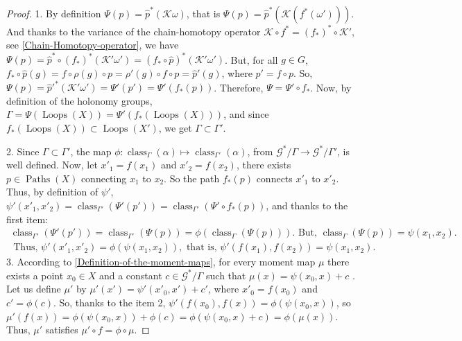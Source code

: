 \documentclass[10pt,reqno,twoside]{amsart}
\newcommand{\cG}{\mathcal{G}}
\newcommand{\cK}{\mathcal{K}}
\DeclareMathOperator{\Paths}{Paths}
\DeclareMathOperator{\Loops}{Loops}
\DeclareMathOperator{\class}{class}
\theoremstyle{plain}
\theoremstyle{definition}
\begin{document}
  \begin{proof}
    1. By definition $\Psi(p) = \hat p^*(\cK\omega)$,
    that is $ \Psi(p) = \hat p^*(\cK(f^*(\omega')))$.
    And thanks to the variance of the chain-homotopy operator $\cK \circ f^* = (f_*)^* \circ \cK'$,
    see \ref{Chain-Homotopy-operator},
    we have $\Psi(p) = \hat p^* \circ (f_*)^* (\cK'\omega') = (f_* \circ \hat p)^*(\cK'\omega')$.
    But,
    for all $g \in G$,
    $f_* \circ \hat p(g) = f \circ \rho(g) \circ p = \rho'(g) \circ f \circ p = \hat p'(g)$,
    where $p' = f \circ p$.
    So,
    $\Psi(p) = \hat p'^*(\cK' \omega') = \Psi'(p') = \Psi'(f_*(p))$.
    Therefore,
    $\Psi = \Psi' \circ f_*$.
    Now,
    by definition of the holonomy groups,
    $\Gamma = \Psi(\Loops(X)) = \Psi'(f_*(\Loops(X)))$,
    and since $f_*(\Loops(X)) \subset \Loops(X')$,
    we get $\Gamma \subset \Gamma'$.
    
    2. Since $\Gamma \subset \Gamma'$,
    the map $\phi : \class_\Gamma(\alpha) \mapsto \class_{\Gamma'}(\alpha)$,
    from $\cG^*\!/\Gamma \to \cG^*\!/\Gamma'$,
    is well defined.
    Now,
    let $x'_1 = f(x_1)$ and $x'_2 = f(x_2)$,
    there exists $p \in \Paths(X)$ connecting $x_1$ to $x_2$.
    So the path $f_*(p)$ connects $x'_1$ to $x'_2$.
    Thus,
    by definition of $\psi'$,
    $\psi'(x'_1,x'_2) = \class_{\Gamma'}(\Psi'(p')) = \class_{\Gamma'}(\Psi'\circ f_*(p))$,
    and thanks to the first item:
    \begin{multline*}
      \class_{\Gamma'}(\Psi'(p')) = \class_{\Gamma'}(\Psi(p)) = \phi(\class_\Gamma(\Psi(p))).
      \text{ But, } \class_\Gamma(\Psi(p)) = \psi(x_1,x_2). \\
      \text{ Thus, }
      \psi'(x'_1,x'_2) = \phi(\psi(x_1,x_2)),
      \text{ that is, }
      \psi'(f(x_1), f(x_2)) = \psi(x_1,x_2).
    \end{multline*}
    3. According to \ref{Definition-of-the-moment-maps},
    for every moment map $\mu$ there exists a point $x_0 \in X$ and a constant $c \in \cG^*\!/\Gamma$ such that $\mu(x) = \psi(x_0,x) + c$ .
    Let us define $\mu'$ by $\mu'(x') = \psi'(x'_0,x') + c'$,
    where $x'_0 = f(x_0)$ and $c' = \phi(c)$.
    So,
    thanks to the item 2,
    $\psi'(f(x_0),f(x)) = \phi(\psi(x_0,x))$,
    so $\mu'(f(x)) = \phi(\psi(x_0,x)) + \phi(c) = \phi(\psi(x_0,x) + c) = \phi(\mu(x))$.
    Thus,
    $\mu'$ satisfies $\mu' \circ f = \phi \circ \mu$.
    

\end{proof}
\end{document}

